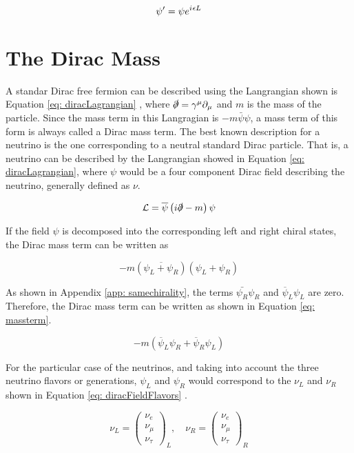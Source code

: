\begin{equation}\label{eq: Ltransformation}
\psi^{\prime} = \psi e^{{i\mkern1mu} \epsilon L} 
\end{equation}

\section{The Dirac Mass}

A standar Dirac free fermion can be described using the Langrangian shown is Equation \ref{eq: diracLagrangian} \cite{NeutrinoMass}, where $\slashed{\partial} = \gamma^{\mu}\partial_{\mu}$ and $m$ is the mass of the particle. Since the mass term in this Langragian is $-m\bar{\psi}\psi$, a mass term of this form is always called a Dirac mass term. The best known description for a neutrino is the one corresponding to a neutral standard Dirac particle. That is, a neutrino can be described by the Langrangian showed in Equation \ref{eq: diracLagrangian}, where $\psi$ would be a four component Dirac field describing the neutrino, generally defined as $\nu$. 

\begin{equation}\label{eq: diracLagrangian}
 \mathcal{L} = \overline{\psi}\left(i\slashed{\partial} - m\right)\psi
\end{equation} 

If the field $\psi$ is decomposed into the corresponding left and right chiral states, the Dirac mass term can be written as 

$$-m(\overline{\psi_{L} + \psi_{R}})(\psi_{L} + \psi_{R})$$

As shown in Appendix \ref{app: samechirality}, the terms $\bar{\psi_{R}}\psi_{R}$ and $\overline{\psi}_{L}\psi_{L}$ are zero. Therefore, the Dirac mass term can be written as shown in Equation \ref{eq: massterm}. 

\begin{equation} \label{eq: massterm}
-m \left(\overline{\psi}_{L}\psi_{R} + \overline{\psi}_{R}\psi_{L}\right)
\end{equation}

For the particular case of the neutrinos, and taking into account the three neutrino flavors or generations, $\psi_{L}$ and $\psi_{R}$ would correspond to the $\nu_{L}$ and $\nu_{R}$ shown in Equation \ref{eq: diracFieldFlavors} \cite{NeutrinoMass}.

\begin{equation}\label{eq: diracFieldFlavors}
\nu_{L} = \begin{pmatrix} \nu_{e}\\ \nu_{\mu} \\ \nu_{\tau} \end{pmatrix}_{L} , \quad \nu_{R} = \begin{pmatrix} \nu_{e}\\ \nu_{\mu} \\ \nu_{\tau} \end{pmatrix}_{R}
\end{equation}

